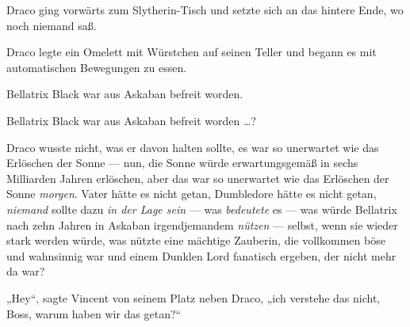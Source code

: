 Draco ging vorwärts zum Slytherin-Tisch und setzte sich an das hintere Ende, wo noch niemand saß.

Draco legte ein Omelett mit Würstchen auf seinen Teller und begann es mit automatischen Bewegungen zu essen.

Bellatrix Black war aus Askaban befreit worden.

Bellatrix Black war aus Askaban befreit worden …?

Draco wusste nicht, was er davon halten sollte, es war so unerwartet wie das Erlöschen der Sonne — nun, die Sonne würde erwartungsgemäß in sechs Milliarden Jahren erlöschen, aber das war so unerwartet wie das Erlöschen der Sonne \emph{morgen}. Vater hätte es nicht getan, Dumbledore hätte es nicht getan, \emph{niemand} sollte dazu \emph{in der Lage sein} — was \emph{bedeutete} es — was würde Bellatrix nach zehn Jahren in Askaban irgendjemandem \emph{nützen} — selbst, wenn sie wieder stark werden würde, was nützte eine mächtige Zauberin, die vollkommen böse und wahnsinnig war und einem Dunklen Lord fanatisch ergeben, der nicht mehr da war?

„Hey“, sagte Vincent von seinem Platz neben Draco, „ich verstehe das nicht, Boss, warum haben wir das getan?“

